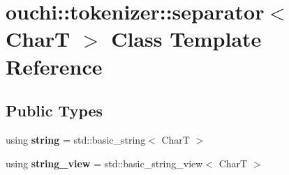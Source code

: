 \hypertarget{classouchi_1_1tokenizer_1_1separator}{}\section{ouchi\+::tokenizer\+::separator$<$ CharT $>$ Class Template Reference}
\label{classouchi_1_1tokenizer_1_1separator}
\subsection*{Public Types}
\begin{DoxyCompactItemize}
\item 
\mbox{\label{classouchi_1_1tokenizer_1_1separator_acab4bcdefe909bb06073c9d353c48fa0}} 
using {\bfseries string} = std\+::basic\+\_\+string$<$ CharT $>$
\item 
\mbox{\label{classouchi_1_1tokenizer_1_1separator_a3296c5b19796d6877f68c16ae118f521}} 
using {\bfseries string\+\_\+view} = std\+::basic\+\_\+string\+\_\+view$<$ CharT $>$
\end{DoxyCompactItemize}
